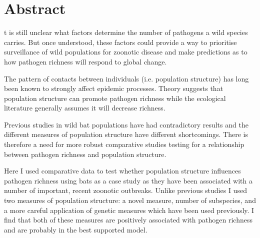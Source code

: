 





\section{Abstract}


t is still unclear what factors determine the number of pathogens a wild species carries.
But once understood, these factors could provide a way to prioritise surveillance of wild populations for zoonotic disease and make predictions as to how pathogen richness will respond to global change.




The pattern of contacts between individuals (i.e. population structure) has long been known to strongly affect epidemic processes.
Theory suggests that population structure can promote pathogen richness while the ecological literature generally assumes it will decrease richness.



Previous studies in wild bat populations have had contradictory results and the different measures of population structure have different shortcomings.
There is therefore a need for more robust comparative studies testing for a relationship between pathogen richness and population structure.


Here I used comparative data to test whether population structure influences pathogen richness using bats as a case study as they have been associated with a number of important, recent zoonotic outbreaks.
Unlike previous studies I used two measures of population structure: a novel measure, number of subspecies, and a more careful application of genetic measures which have been used previously.
I find that both of these measures are positively associated with pathogen richness and are probably in the best supported model.




